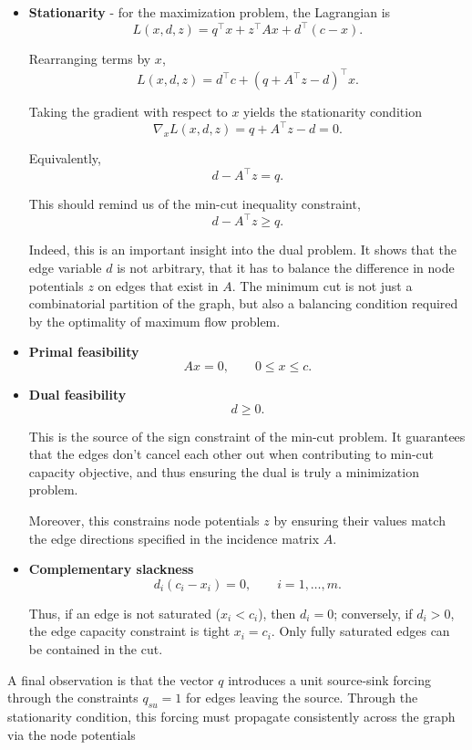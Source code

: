 \documentclass[12pt, openany]{article}
\begin{document}
\begin{itemize}
    \item \textbf{Stationarity} - for the maximization problem, the Lagrangian is
    \[
    L(x,d,z) = q^\top x + z^\top Ax + d^\top(c-x).
    \]

    Rearranging terms by \(x\),
    \[
    L(x,d,z) = d^\top c + (q + A^\top z - d)^\top x.
    \]

    Taking the gradient with respect to \(x\) yields the stationarity condition
    \[ 
    \nabla_x L(x,d,z) = q + A^\top z - d = 0.
    \]

    Equivalently,
    \[
    d - A^\top z = q.
    \]
    
    This should remind us of the min-cut inequality constraint,
    \[
    d - A^\top z \ge q.
    \]

    Indeed, this is an important insight into the dual problem. It shows that the edge variable $d$ is not arbitrary, that it has to balance the difference in node potentials $z$ on edges that exist in $A$. The minimum cut is not just a combinatorial partition of the graph, but also a balancing condition required by the optimality of maximum flow problem.


    \item \textbf{Primal feasibility}
    \[
    Ax = 0,
    \qquad
    0 \le x \le c.
    \]

    \item \textbf{Dual feasibility}
    \[
    d \ge 0.
    \]

    This is the source of the sign constraint of the min-cut problem. It guarantees that the edges don't cancel each other out when contributing to min-cut capacity objective, and thus ensuring the dual is truly a minimization problem.

    Moreover, this constrains node potentials $z$ by ensuring their values match the edge directions specified in the incidence matrix $A$.

    \item \textbf{Complementary slackness}
    \[
    d_i(c_i-x_i)=0,
    \qquad i=1,\dots,m.
    \]

    Thus, if an edge is not saturated (\(x_i<c_i\)), then \(d_i=0\); conversely, if \(d_i>0\), the edge capacity constraint is tight \(x_i = c_i\). Only fully saturated edges can be contained in the cut.

\end{itemize}

A final observation is that the vector \(q\) introduces a unit source-sink forcing through the constraints \(q_{su}=1\) for edges leaving the source. Through the stationarity condition, this forcing must propagate consistently across the graph via the node potentials
\end{document}
